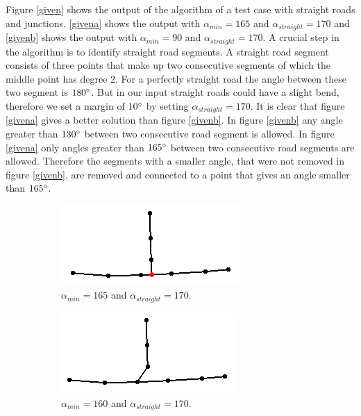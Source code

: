 \documentclass[11pt]{article}
\begin{document}
Figure \ref{given} shows the output of the algorithm of a test case with straight roads and junctions. \ref{givena} shows the output with $\alpha_{min}=165$ and $\alpha_{straight}=170$ and \ref{givenb} shows the output with $\alpha_{min}=90$ and $\alpha_{straight}=170$. A crucial step in the algorithm is to identify straight road segments. A straight road segment consists of three points that make up two consecutive segments of which the middle point has degree 2. For a perfectly straight road the angle between these two segment is $180\degree$. But in our input straight roads could have a slight bend, therefore we set a margin of $10\degree$ by setting $\alpha_{straight}=170$. It is clear that figure \ref{givena} gives a better solution than figure \ref{givenb}. In figure \ref{givenb} any angle greater than $130\degree$ between two consecutive road segment is allowed. In figure \ref{givena} only angles greater than $165\degree$ between two consecutive road segments are allowed. Therefore the segments with a smaller angle, that were not removed in figure \ref{givenb}, are removed and connected to a point that gives an angle smaller than $165\degree$.

\begin{figure}[h]
\centering
  \begin{subfigure}{0.4\linewidth}
  \centering
  \graphicspath{ {images/}}
  \includegraphics[width=\linewidth]{test1165_170}
  \caption{$\alpha_{min}=165$ and $\alpha_{straight}=170$.}
  \label{tjunctiona}
  \end{subfigure}
    \begin{subfigure}{0.4\linewidth}
  \centering
  \graphicspath{ {images/}}
  \includegraphics[width=\linewidth]{test1140_170}
  \caption{$\alpha_{min}=160$ and $\alpha_{straight}=170$.}
  \label{tjunctionb}
  \end{subfigure}
  \caption{}
\label{tjunction}
\end{figure}
\end{document}
